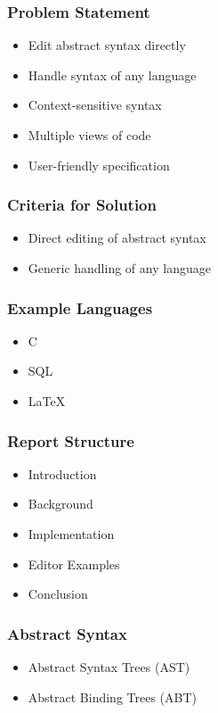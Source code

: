 \documentclass[t,24pt,aspectratio=169]{beamer}
\begin{document}
\begin{frame}[hvid]
    \frametitle{Problem Statement}
    \begin{itemize}
        \item Edit abstract syntax directly
        \item Handle syntax of any language
        \item Context-sensitive syntax
        \item Multiple views of code
        \item User-friendly specification
    \end{itemize}
\end{frame}

\begin{frame}[hvid]
    \frametitle{Criteria for Solution}
    \begin{itemize}
        \item Direct editing of abstract syntax
        \item Generic handling of any language
    \end{itemize}
\end{frame}

\begin{frame}[hvid]
    \frametitle{Example Languages}
    \begin{itemize}
        \item C
        \item SQL
        \item LaTeX
    \end{itemize}
\end{frame}

\begin{frame}[hvid]
    \frametitle{Report Structure}
    \begin{itemize}
        \item Introduction
        \item Background
        \item Implementation
        \item Editor Examples
        \item Conclusion
    \end{itemize}
\end{frame}

\begin{frame}[hvid]
    \frametitle{Abstract Syntax}
    \begin{itemize}
        \item Abstract Syntax Trees (AST)
        \item Abstract Binding Trees (ABT)
    \end{itemize}
\end{frame}
\end{document}
